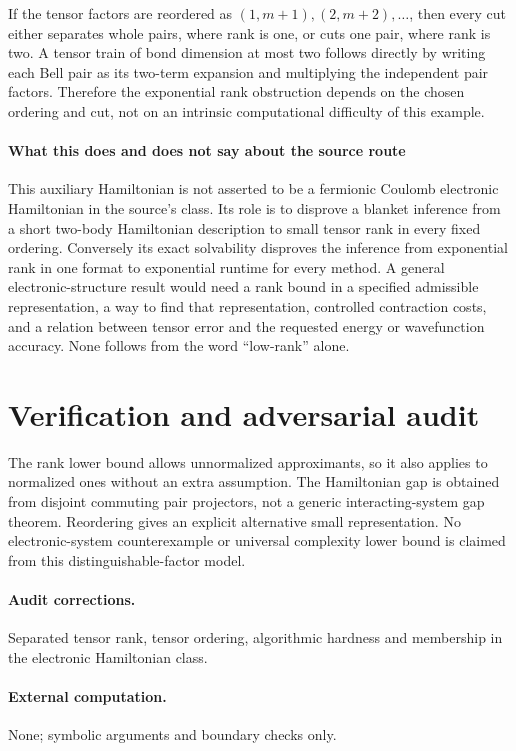\documentclass[11pt]{article}
\begin{document}
If the tensor factors are reordered as $(1,m+1),(2,m+2),\ldots$, then every cut either separates whole pairs, where rank is one, or cuts one pair, where rank is two. A tensor train of bond dimension at most two follows directly by writing each Bell pair as its two-term expansion and multiplying the independent pair factors. Therefore the exponential rank obstruction depends on the chosen ordering and cut, not on an intrinsic computational difficulty of this example.

\paragraph{What this does and does not say about the source route}
This auxiliary Hamiltonian is not asserted to be a fermionic Coulomb electronic Hamiltonian in the source's class. Its role is to disprove a blanket inference from a short two-body Hamiltonian description to small tensor rank in every fixed ordering. Conversely its exact solvability disproves the inference from exponential rank in one format to exponential runtime for every method. A general electronic-structure result would need a rank bound in a specified admissible representation, a way to find that representation, controlled contraction costs, and a relation between tensor error and the requested energy or wavefunction accuracy. None follows from the word ``low-rank'' alone.

\section{Verification and adversarial audit}
The rank lower bound allows unnormalized approximants, so it also applies to normalized ones without an extra assumption. The Hamiltonian gap is obtained from disjoint commuting pair projectors, not a generic interacting-system gap theorem. Reordering gives an explicit alternative small representation. No electronic-system counterexample or universal complexity lower bound is claimed from this distinguishable-factor model.
\paragraph{Audit corrections.} Separated tensor rank, tensor ordering, algorithmic hardness and membership in the electronic Hamiltonian class.
\paragraph{External computation.} None; symbolic arguments and boundary checks only.
\end{document}
